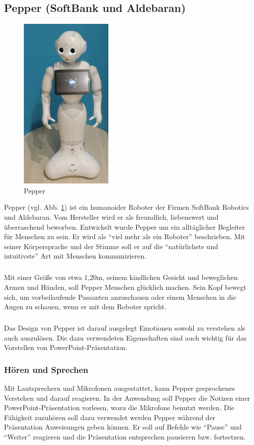 \subsection{Pepper (SoftBank und Aldebaran)}\label{sec:pepper}
\begin{figure}
  \centering  
     \includegraphics[width=0.4\textwidth]{pepper}
  \caption{Pepper}
  \label{fig:pepper}
\end{figure}
Pepper (vgl. Abb. \ref{fig:pepper}) ist ein humanoider Roboter der Firmen SoftBank
Robotics und Aldebaran.
Vom Hersteller wird er als freundlich, liebenswert und überraschend beworben.
Entwickelt wurde Pepper um ein alltäglicher Begleiter für Menschen zu sein. Er
wird als "`viel mehr als ein Roboter"' beschrieben. Mit seiner Körpersprache und
der Stimme soll er auf die "`natürlichste und intuitivste"' Art mit Menschen
kommunizieren. \cite{SoftBank2018}

\subparagraph{}
Mit einer Größe von etwa 1,20m, seinem kindlichen Gesicht und beweglichen Armen
und Händen, soll Pepper Menschen glücklich machen. Sein Kopf bewegt sich, um
vorbeilaufende Passanten anzuschauen oder einem Menschen in die Augen zu
schauen, wenn er mit dem Roboter spricht. \cite{Markowitz2015}

\subparagraph{}
Das Design von Pepper ist darauf ausgelegt Emotionen sowohl zu verstehen als
auch auszulösen. Die dazu verwendeten Eigenschaften sind auch wichtig für das
Vorstellen von PowerPoint-Präsentation.

\subsubsection{Hören und Sprechen}\label{sec:hoeren-und-sehen}
Mit Lautsprechern und Mikrofonen ausgestattet, kann Pepper gesprochenes
Verstehen und darauf reagieren. \cite{SoftBankII2018} In der Anwendung soll
Pepper die Notizen einer PowerPoint-Präsentation vorlesen, wozu die Mikrofone benutzt werden. Die
Fähigkeit zuzuhören soll dazu verwendet werden Pepper während der Präsentation
Anweisungen geben können. Er soll auf Befehle wie "`Pause"' und "`Weiter"'
reagieren und die Präsentation entsprechen pausieren bzw. fortsetzen.

